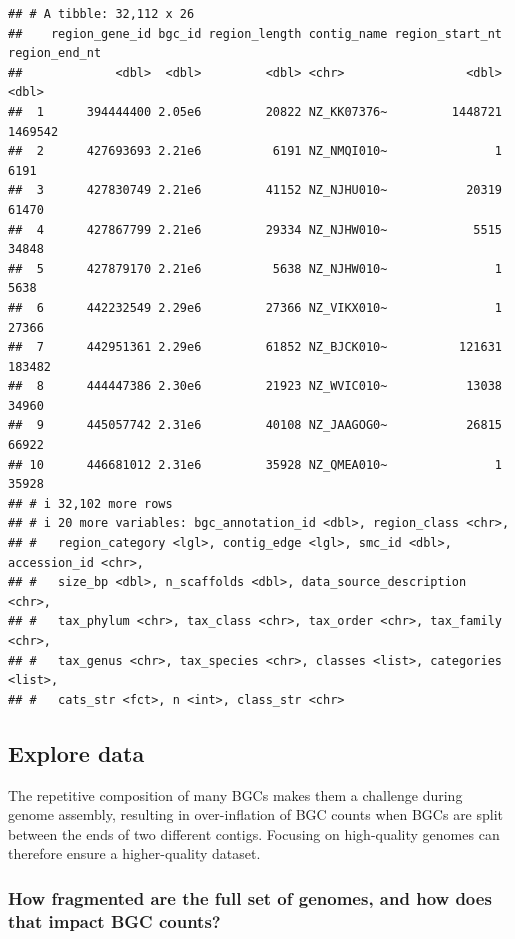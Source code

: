 \documentclass[
]{article}
\begin{document}
\begin{verbatim}
## # A tibble: 32,112 x 26
##    region_gene_id bgc_id region_length contig_name region_start_nt region_end_nt
##             <dbl>  <dbl>         <dbl> <chr>                 <dbl>         <dbl>
##  1      394444400 2.05e6         20822 NZ_KK07376~         1448721       1469542
##  2      427693693 2.21e6          6191 NZ_NMQI010~               1          6191
##  3      427830749 2.21e6         41152 NZ_NJHU010~           20319         61470
##  4      427867799 2.21e6         29334 NZ_NJHW010~            5515         34848
##  5      427879170 2.21e6          5638 NZ_NJHW010~               1          5638
##  6      442232549 2.29e6         27366 NZ_VIKX010~               1         27366
##  7      442951361 2.29e6         61852 NZ_BJCK010~          121631        183482
##  8      444447386 2.30e6         21923 NZ_WVIC010~           13038         34960
##  9      445057742 2.31e6         40108 NZ_JAAGOG0~           26815         66922
## 10      446681012 2.31e6         35928 NZ_QMEA010~               1         35928
## # i 32,102 more rows
## # i 20 more variables: bgc_annotation_id <dbl>, region_class <chr>,
## #   region_category <lgl>, contig_edge <lgl>, smc_id <dbl>, accession_id <chr>,
## #   size_bp <dbl>, n_scaffolds <dbl>, data_source_description <chr>,
## #   tax_phylum <chr>, tax_class <chr>, tax_order <chr>, tax_family <chr>,
## #   tax_genus <chr>, tax_species <chr>, classes <list>, categories <list>,
## #   cats_str <fct>, n <int>, class_str <chr>
\end{verbatim}

\hypertarget{explore-data}{%
\subsection{Explore data}\label{explore-data}}

The repetitive composition of many BGCs makes them a challenge during
genome assembly, resulting in over-inflation of BGC counts when BGCs are
split between the ends of two different contigs. Focusing on
high-quality genomes can therefore ensure a higher-quality dataset.

\hypertarget{how-fragmented-are-the-full-set-of-genomes-and-how-does-that-impact-bgc-counts}{%
\subsubsection{How fragmented are the full set of genomes, and how does
that impact BGC
counts?}\label{how-fragmented-are-the-full-set-of-genomes-and-how-does-that-impact-bgc-counts}}
\end{document}
